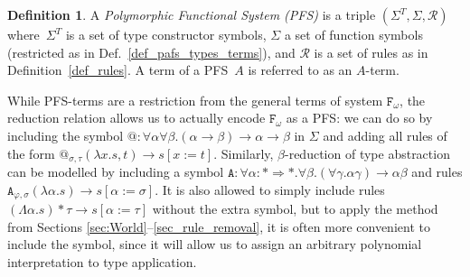\documentclass[a4paper,UKenglish,cleveref,autoref,numberwithinsect]{lipics-v2019}
\theoremstyle{definition}
\newtheorem{defn}[theorem]{Definition}
\newcommand{\Fomega}{\mathtt{F}_\omega}
\newcommand{\Rules}{\mathcal{R}}
\newcommand{\arrkind}{\Rightarrow}
\newcommand{\arrtype}{\rightarrow}
\newcommand{\abs}[2]{\lambda #1.#2}
\newcommand{\tabs}[2]{\Lambda #1.#2}
\newcommand{\red}{\longrightarrow}
\begin{document}
\begin{defn}\label{def_pafs}
  A \emph{Polymorphic Functional System (PFS)} is a triple
  $(\Sigma^T,\Sigma,\Rules)$ where~$\Sigma^T$ is a set of type
  constructor symbols, $\Sigma$ a set of function symbols (restricted
  as in Def.~\ref{def_pafs_types_terms}), and $\Rules$ is a set
  of rules as in Definition~\ref{def_rules}. A term of a
  PFS~$A$ is referred to as an $A$-term.
\end{defn}

While PFS-terms are a restriction from the general terms
of system $\Fomega$, the reduction relation allows us to actually encode
$\Fomega$ as a PFS: we can do so by including the symbol
${@} : \forall\alpha\forall\beta . (\alpha \arrtype \beta) \arrtype \alpha
\arrtype \beta$ in $\Sigma$ and adding all rules of the form
$@_{\sigma,\tau}(\abs{x}{s},t) \red s[x:=t]$.
Similarly, $\beta$-reduction of type abstraction can be modelled
by including a symbol
$\mathtt{A} : \forall \alpha : * \arrkind * . \forall \beta . (\forall
\gamma.\alpha \gamma) \arrtype \alpha \beta$ and rules
$\mathtt{A}_{\varphi,\sigma}(\abs{\alpha}{s}) \red s[\alpha:=\sigma]$.
It is also allowed to simply include rules
$(\tabs{\alpha}{s})*\tau \red s[\alpha:=\tau]$ without the extra
symbol, but to apply the method from
Sections \ref{sec:World}--\ref{sec_rule_removal}, it is often more
convenient to include the symbol, since it will allow us to assign an
arbitrary polynomial interpretation to type application.
\end{document}
